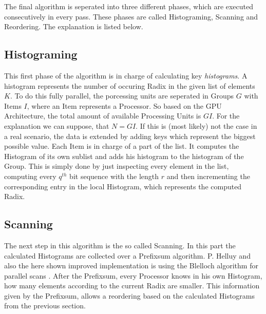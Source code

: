 \documentclass{llncs}
\begin{document}
The final algorithm is seperated into three different phases, which are executed consecutively in every pass. These phases are called Histograming, Scanning and Reordering. The explanation is listed below.



\subsection{Histograming}
This first phase of the algorithm is in charge of calculating key \textit{histograms}. A histogram represents the number of occuring Radix in the given list of elements $K$. To do this fully parallel, the porcessing units are seperated in Groups $G$ with Items $I$, where an Item represents a Processor. So based on the GPU Architecture, the total amount of available Processing Units is $GI$. For the explanation we can suppose, that $N=GI$. If this is (most likely) not the case in a real scenario, the data is extended by adding keys which represent the biggest possible value. Each Item is in charge of a part of the list. It computes the Histogram of its own sublist and adds his histogram to the histogram of the Group. This is simply done by just inspecting every element in the list, computing every $q^{th}$ bit sequence with the length $r$ and then incrementing the corresponding entry in the local Histogram, which represents the computed Radix.


\subsection{Scanning}
The next step in this algorithm is the so called Scanning. In this part the calculated Histograms are collected over a Prefixsum algorithm. P. Helluy \cite{ocl-radix-helluy} and also the here shown improved implementation is using the Blelloch algorithm for parallel scans \cite{blelloch1989scans}. After the Prefixsum, every Processor knows in his own Histogram, how many elements according to the current Radix are smaller. This information given by the Prefixsum, allows a reordering based on the calculated Histograms from the previous section.
\end{document}
